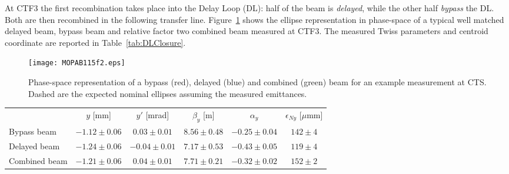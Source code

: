 At CTF3 the first recombination takes place into the Delay Loop (DL): 
half of the beam is \emph{delayed}, while the other half \emph{bypass} the DL. 
Both are then recombined in the following transfer line. 
Figure~\ref{fig:DLClosure} shows the ellipse representation in phase-space of 
a typical well matched delayed beam, bypass beam and 
relative factor two combined beam measured at CTF3.
The measured Twiss parameters and centroid coordinate are reported in Table~\ref{tab:DLClosure}.
%
\begin{figure}[htb]
   \centering
   \texttt{[image: MOPAB115f2.eps]}
   \caption{Phase-space representation of a bypass (red), delayed (blue) and combined (green) beam 
            for an example measurement at CTS. 
            Dashed are the expected nominal ellipses assuming the measured emittances.}
   \label{fig:DLClosure}
\end{figure}
%
\begin{table*}[bt]
   \centering
   \caption{Beam Centroid and Twiss Parameters Related to Fig.~\ref{fig:DLClosure}}
   \begin{tabular}{ l c c c c c}
    \hline
    	&  $y$ [mm]	& $y'$ [mrad]	& $\beta_y$ [m]	& $\alpha_y$	& $\epsilon_{Ny}$ [$\mu$mm] \\
Bypass beam	& $-1.12\pm0.06$	&$ 0.03\pm0.01$	& $8.56\pm0.48$	& $-0.25\pm0.04$	& $142\pm4$ \\
Delayed beam	& $-1.24\pm0.06$  	&$-0.04\pm0.01$	& $7.17\pm0.53$	& $-0.43\pm0.05$	& $119\pm4$ \\
Combined beam	& $-1.21\pm0.06$   	&$ 0.04\pm0.01$	& $7.71\pm0.21$	& $-0.32\pm0.02$	& $152\pm2$ \\
    \hline
   \end{tabular}
   \label{tab:DLClosure}
\end{table*}
%



